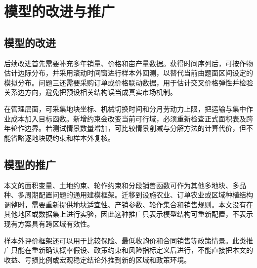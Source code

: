 \section{模型的改进与推广}

\subsection{模型的改进}

后续改进首先需要补充多年销量、价格和亩产量数据。获得时间序列后，可按作物估计边际分布，并采用滚动时间窗进行样本外回测，以替代当前由题面区间设定的模拟分布。问题三还需要采购订单或价格联动数据，用于估计交叉价格弹性并检验关系边方向，避免把预设相关结构误当成真实市场机制。

在管理层面，可采集地块坐标、机械切换时间和分月劳动力上限，把运输与集中作业成本加入目标函数。新增约束会改变当前可行域，必须重新检查正式面积表及跨年轮作边界。若测试情景数量增加，可比较情景削减与分解方法的计算代价，但不能省略逐地块硬约束和样本外复核。

\subsection{模型的推广}

本文的面积变量、土地约束、轮作约束和分段销售函数可作为其他多地块、多品种、多周期配置问题的通用建模框架。迁移到设施农业、订单农业或区域种植结构调整时，需要重新提供地块适宜性、产销参数、轮作集合和销售规则。本文没有在其他地区或数据集上进行实验，因此这种推广只表示模型结构可重新配置，不表示现有方案具有跨区域有效性。

样本外评价框架还可以用于比较保险、最低收购价和合同销售等政策情景。此类推广只能在重新确认概率假设、政策约束和风险指标定义后进行，不能直接把本文的收益、亏损比例或宏观稳定结论外推到新的区域和政策环境。
